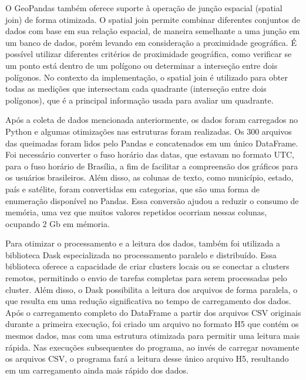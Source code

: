 \documentclass[cic,tc]{iiufrgs}
\begin{document}
O GeoPandas também oferece suporte à operação de junção espacial (spatial join) de forma otimizada. O spatial join permite combinar diferentes conjuntos de dados com base em sua relação espacial, de maneira semelhante a uma junção em um banco de dados, porém levando em consideração a proximidade geográfica. É possível utilizar diferentes critérios de proximidade geográfica, como verificar se um ponto está dentro de um polígono ou determinar a interseção entre dois polígonos. No contexto da implementação, o spatial join é utilizado para obter todas as medições que intersectam cada quadrante (interseção entre dois polígonos), que é a principal informação usada para avaliar um quadrante. \par

Após a coleta de dados mencionada anteriormente, os dados foram carregados no Python e algumas otimizações nas estruturas foram realizadas. Os 300 arquivos das queimadas foram lidos pelo Pandas e concatenados em um único DataFrame. Foi necessário converter o fuso horário das datas, que estavam no formato UTC, para o fuso horário de Brasília, a fim de facilitar a compreensão dos gráficos para os usuários brasileiros. Além disso, as colunas de texto, como município, estado, país e satélite, foram convertidas em categorias, que são uma forma de enumeração disponível no Pandas. Essa conversão ajudou a reduzir o consumo de memória, uma vez que muitos valores repetidos ocorriam nessas colunas, ocupando 2 Gb em mémoria. \par

Para otimizar o processamento e a leitura dos dados, também foi utilizada a biblioteca Dask especializada no processamento paralelo e distribuído. Essa biblioteca oferece a capacidade de criar clusters locais ou se conectar a clusters remotos, permitindo o envio de tarefas completas para serem processadas pelo cluster. Além disso, o Dask possibilita a leitura dos arquivos de forma paralela, o que resulta em uma redução significativa no tempo de carregamento dos dados. Após o carregamento completo do DataFrame a partir dos arquivos CSV originais durante a primeira execução, foi criado um arquivo no formato H5 que contém os mesmos dados, mas com uma estrutura otimizada para permitir uma leitura mais rápida. Nas execuções subsequentes do programa, ao invés de carregar novamente os arquivos CSV, o programa fará a leitura desse único arquivo H5, resultando em um carregamento ainda mais rápido dos dados.  \par
\end{document}
